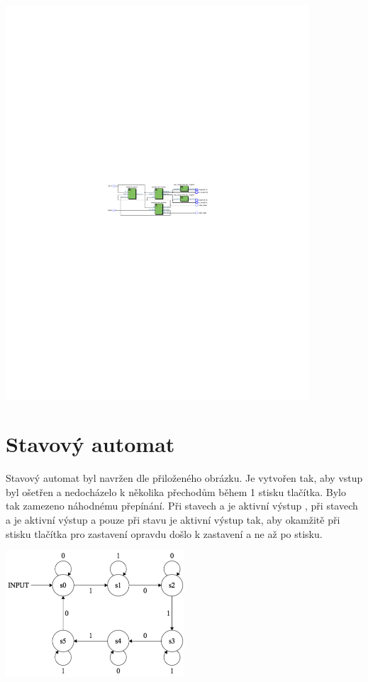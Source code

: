\documentclass[FM,ZP]{tulthesis}
\begin{document}
	\includegraphics[clip,width=0.85\textwidth]{stopwatch.pdf}
	
	\section{Stavový automat}
	Stavový automat byl navržen dle přiloženého obrázku. Je vytvořen tak, aby vstup byl ošetřen a nedocházelo k několika přechodům během 1 stisku tlačítka. Bylo tak zamezeno náhodnému přepínání. Při stavech  a  je aktivní výstup , při stavech  a  je aktivní výstup  a pouze při stavu  je aktivní výstup  tak, aby okamžitě při stisku tlačítka pro zastavení opravdu došlo k zastavení a ne až po stisku.

	\includegraphics[clip,width=0.5\textwidth]{machine.png}
	
\end{document}
